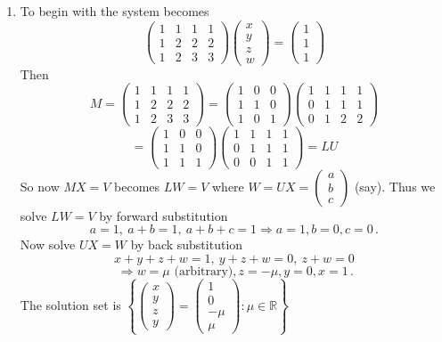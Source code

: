 \begin{enumerate}
\item To begin with the system becomes
$$
\begin{pmatrix}1&1&1&1\\[1mm]1&2&2&2\\[1mm]1&2&3&3
\end{pmatrix}
\begin{pmatrix}x\\[1mm]y\\[1mm]z\\[1mm]w\end{pmatrix}=
\begin{pmatrix}1\\[1mm]1\\[1mm]1\end{pmatrix}
$$
Then
$$
M=
\begin{pmatrix}
1&1&1&1\\[1mm]1&2&2&2\\[1mm]1&2&3&3
\end{pmatrix}
=
\begin{pmatrix}
1&0&0\\[1mm]1&1&0\\[1mm]1&0&1
\end{pmatrix}
\begin{pmatrix}
1&1&1&1\\[1mm]0&1&1&1\\[1mm]0&1&2&2
\end{pmatrix}$$ $$
=
\begin{pmatrix}
1&0&0\\[1mm]1&1&0\\[1mm]1&1&1
\end{pmatrix}
\begin{pmatrix}
1&1&1&1\\[1mm]0&1&1&1\\[1mm]0&0&1&1
\end{pmatrix}=LU
$$
So now $MX=V$ becomes $LW=V$ where $W=UX=\begin{pmatrix}a\\b\\c\end{pmatrix}$ (say). Thus we solve $LW=V$ by forward substitution
$$
a=1,\ a+b=1,  \ a+b+c=1 \Rightarrow a=1,b=0,c=0\, .
$$
Now solve $UX=W$ by back substitution
$$
x+y+z+w=1, \ y+z+w=0, \ z + w =0$$ $$ \ \Rightarrow
w=\mu \mbox{ (arbitrary)}, z=-\mu, y=0, x=1\, .
$$
The solution set is $\left\{\begin{pmatrix}x\\y\\z\\y\end{pmatrix}=\begin{pmatrix}1\\0\\-\mu\\\mu\end{pmatrix}: \mu\in {\mathbb R}\right\}$



\end{enumerate}
